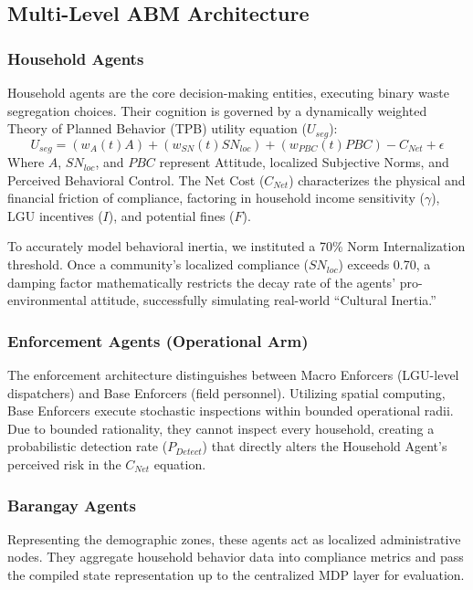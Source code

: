 \documentclass[conference,a4paper]{IEEEtran}
\begin{document}
\subsection{Multi-Level ABM Architecture}

\subsubsection{Household Agents}
Household agents are the core decision-making entities, executing binary waste segregation choices. Their cognition is governed by a dynamically weighted Theory of Planned Behavior (TPB) utility equation ($U_{seg}$):
\begin{equation}
U_{seg} = (w_{A}(t)A) + (w_{SN}(t)SN_{loc}) + (w_{PBC}(t)PBC) - C_{Net} + \epsilon
\end{equation}
Where $A$, $SN_{loc}$, and $PBC$ represent Attitude, localized Subjective Norms, and Perceived Behavioral Control. The Net Cost ($C_{Net}$) characterizes the physical and financial friction of compliance, factoring in household income sensitivity ($\gamma$), LGU incentives ($I$), and potential fines ($F$). 

To accurately model behavioral inertia, we instituted a 70\% Norm Internalization threshold. Once a community's localized compliance ($SN_{loc}$) exceeds 0.70, a damping factor mathematically restricts the decay rate of the agents' pro-environmental attitude, successfully simulating real-world ``Cultural Inertia.''

\subsubsection{Enforcement Agents (Operational Arm)}
The enforcement architecture distinguishes between Macro Enforcers (LGU-level dispatchers) and Base Enforcers (field personnel). Utilizing spatial computing, Base Enforcers execute stochastic inspections within bounded operational radii. Due to bounded rationality, they cannot inspect every household, creating a probabilistic detection rate ($P_{Detect}$) that directly alters the Household Agent's perceived risk in the $C_{Net}$ equation.

\subsubsection{Barangay Agents}
Representing the demographic zones, these agents act as localized administrative nodes. They aggregate household behavior data into compliance metrics and pass the compiled state representation up to the centralized MDP layer for evaluation.
\end{document}
